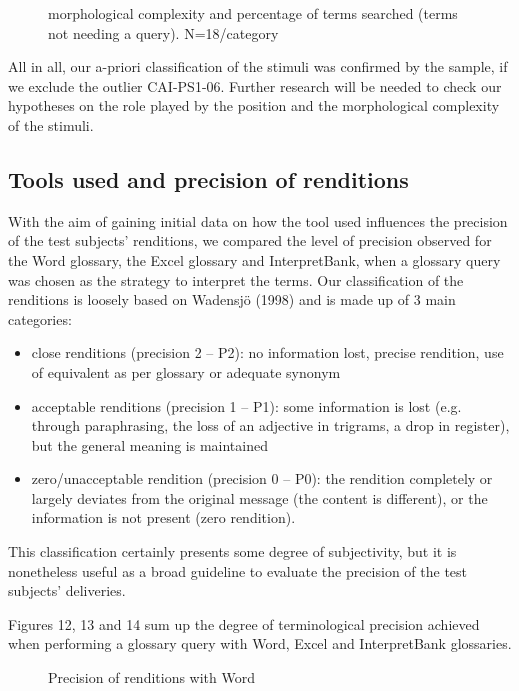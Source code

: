 \documentclass[output=paper]{langsci/langscibook}
\begin{document}
\begin{figure}
\caption{morphological complexity and percentage of terms searched (terms not needing a query). N=18/category}
\label{fig:prandi:11}
\end{figure}

All in all, our a-priori classification of the stimuli was confirmed by the sample, if we exclude the outlier \textsc{CAI}-PS1-06. Further research will be needed to check our hypotheses on the role played by the position and the morphological complexity of the stimuli.

\subsection{Tools used and precision of renditions}\label{sec:prandi:5.2}

With the aim of gaining initial data on how the tool used influences the precision of the test subjects’ renditions, we compared the level of precision observed for the Word glossary, the Excel glossary and InterpretBank, when a glossary query was chosen as the strategy to interpret the terms. Our classification of the renditions is loosely based on Wadensjö (1998) and is made up of 3 main categories:

\begin{itemize}
\item close renditions (precision 2 – P2): no information lost, precise rendition, use of equivalent as per glossary or adequate synonym
\item acceptable renditions (precision 1 – P1): some information is lost (e.g. through paraphrasing, the loss of an adjective in trigrams, a drop in register), but the general meaning is maintained
\item zero/unacceptable rendition (precision 0 – P0): the rendition completely or largely deviates from the original message (the content is different), or the information is not present (zero rendition).
\end{itemize}

This classification certainly presents some degree of subjectivity, but it is nonetheless useful as a broad guideline to evaluate the precision of the test subjects’ deliveries.

Figures 12, 13 and 14 sum up the degree of terminological precision achieved when performing a glossary query with Word, Excel and InterpretBank glossaries. 

\begin{figure}
\caption{Precision of renditions with Word}
\label{fig:prandi:12}
\end{figure}
\end{document}
